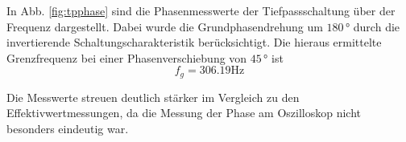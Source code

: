 In Abb. \ref{fig:tpphase} sind die Phasenmesswerte der Tiefpassschaltung über der
Frequenz dargestellt. Dabei wurde die Grundphasendrehung um
$180 \, \si{\degree}$ durch die invertierende Schaltungscharakteristik berücksichtigt.
Die hieraus ermittelte Grenzfrequenz bei einer Phasenverschiebung von $45 \,
\si{\degree}$ ist
\[f_g = 306.19 \si{\hertz}\]

Die Messwerte streuen deutlich stärker im Vergleich zu den
Effektivwertmessungen, da die Messung der Phase am Oszilloskop nicht besonders eindeutig war.